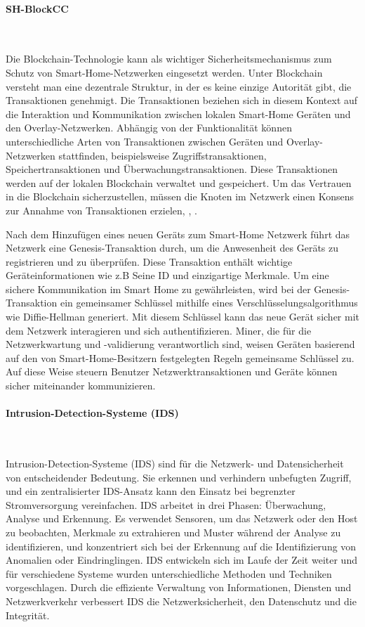 \paragraph{SH-BlockCC}\

Die Blockchain-Technologie kann als wichtiger Sicherheitsmechanismus zum Schutz von Smart-Home-Netzwerken eingesetzt werden. Unter Blockchain versteht man eine dezentrale Struktur, in der es keine einzige Autorität gibt, die Transaktionen genehmigt. Die Transaktionen beziehen sich in diesem Kontext auf die Interaktion und Kommunikation zwischen lokalen Smart-Home Geräten und den Overlay-Netzwerken. Abhängig von der Funktionalität können unterschiedliche Arten von Transaktionen zwischen Geräten und Overlay-Netzwerken stattfinden, beispielsweise Zugriffstransaktionen, Speichertransaktionen und Überwachungstransaktionen. Diese Transaktionen werden auf der lokalen Blockchain verwaltet und gespeichert. Um das Vertrauen in die Blockchain sicherzustellen, müssen die Knoten im Netzwerk einen Konsens zur Annahme von Transaktionen erzielen\cite{singh2019sh}, \cite{dorri2017blockchain}, \cite{khatoun2022cybersecurity}. 

Nach dem Hinzufügen eines neuen Geräts zum Smart-Home Netzwerk führt das Netzwerk eine Genesis-Transaktion durch, um die Anwesenheit des Geräts zu registrieren und zu überprüfen. Diese Transaktion enthält wichtige Geräteinformationen wie z.B Seine ID und einzigartige Merkmale. Um eine sichere Kommunikation im Smart Home zu gewährleisten, wird bei der Genesis-Transaktion ein gemeinsamer Schlüssel mithilfe eines Verschlüsselungsalgorithmus wie Diffie-Hellman generiert. Mit diesem Schlüssel kann das neue Gerät sicher mit dem Netzwerk interagieren und sich authentifizieren. Miner, die für die Netzwerkwartung und -validierung verantwortlich sind, weisen Geräten basierend auf den von Smart-Home-Besitzern festgelegten Regeln gemeinsame Schlüssel zu. Auf diese Weise steuern Benutzer Netzwerktransaktionen und Geräte können sicher miteinander kommunizieren\cite{singh2019sh}\cite{dorri2017blockchain}.



\paragraph{Intrusion-Detection-Systeme (IDS)}
\

Intrusion-Detection-Systeme (IDS) sind für die Netzwerk- und Datensicherheit von entscheidender Bedeutung. Sie erkennen und verhindern unbefugten Zugriff, und ein zentralisierter IDS-Ansatz kann den Einsatz bei begrenzter Stromversorgung vereinfachen. IDS arbeitet in drei Phasen: Überwachung, Analyse und Erkennung. Es verwendet Sensoren, um das Netzwerk oder den Host zu beobachten, Merkmale zu extrahieren und Muster während der Analyse zu identifizieren, und konzentriert sich bei der Erkennung auf die Identifizierung von Anomalien oder Eindringlingen. IDS entwickeln sich im Laufe der Zeit weiter und für verschiedene Systeme wurden unterschiedliche Methoden und Techniken vorgeschlagen. Durch die effiziente Verwaltung von Informationen, Diensten und Netzwerkverkehr verbessert IDS die Netzwerksicherheit, den Datenschutz und die Integrität\cite{smys2020hybrid}\cite{elrawy2018intrusion}.

